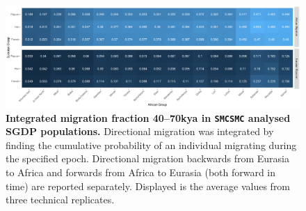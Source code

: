 \begin{figure}
	\centering
	\includegraphics[width=\textwidth]{plot/integrated_sgdp.pdf}
	\caption[Integrated Migration Fraction in the SGDP]{{\bf Integrated migration fraction 40--70kya in {\tt SMCSMC} analysed SGDP populations.} Directional migration was integrated by finding the cumulative probability of an individual migrating during the specified epoch. Directional migration backwards from Eurasia to Africa and forwards from Africa to Eurasia (both forward in time) are reported separately. Displayed is the average values from three technical replicates.}
	\label{fig:sgdp_heatmap}
\end{figure}


